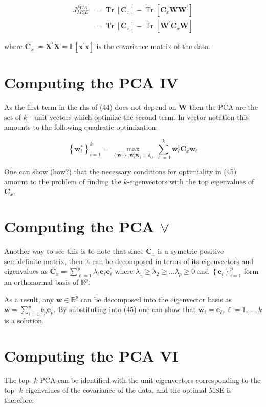 \documentclass[11pt]{article}
\theoremstyle{plain} %
\theoremstyle{remark}
\begin{document}
$$
\begin{aligned}
J_{M S E}^{P C A} & =\operatorname{Tr}\left[\mathbf{C}_{x}\right]-\operatorname{Tr}\left[\mathbf{C}_{x} \mathbf{W} \mathbf{W}^{\prime}\right] \\
& =\operatorname{Tr}\left[\mathbf{C}_{x}\right]-\operatorname{Tr}\left[\mathbf{W}^{\prime} \mathbf{C}_{x} \mathbf{W}\right]
\end{aligned}
$$

where $\mathbf{C}_{x}:=\mathbf{X}^{\prime} \mathbf{X}=\mathbb{E}\left[\mathbf{x}^{\prime} \mathbf{x}\right]$ is the covariance matrix of the data.

\section*{Computing the PCA IV}
As the first term in the rhs of (44) does not depend on $\mathbf{W}$ then the PCA are the set of $k$ - unit vectors which optimize the second term. In vector notation this amounts to the following quadratic optimization:

$$
\left\{\mathbf{w}_{i}^{*}\right\}_{i=1}^{k}=\max _{\left\{\mathbf{w}_{i}\right\}, \mathbf{w}_{i}^{\prime} \mathbf{w}_{j}=\delta_{i j}} \sum_{\ell=1}^{k} \mathbf{w}_{\ell}^{\prime} \mathbf{C}_{x} \mathbf{w}_{\ell}
$$

One can show (how?) that the necessary conditions for optimiality in (45) amount to the problem of finding the $k$-eigenvectors with the top eigenvalues of $\mathbf{C}_{x}$.

\section*{Computing the PCA $\vee$}
Another way to see this is to note that since $\mathbf{C}_{x}$ is a symetric positive semidefinite matrix, then it can be decomposed in terms of its eigenvectors and eigenvalues as $\mathbf{C}_{x}=\sum_{\ell=1}^{p} \lambda_{\ell} \mathbf{e}_{\ell} \mathbf{e}_{\ell}^{\prime}$ where $\lambda_{1} \geq \lambda_{2} \geq \ldots \lambda_{p} \geq 0$ and $\left\{\mathbf{e}_{i}\right\}_{i=1}^{p}$ form an orthonormal basis of $\mathbb{R}^{p}$.

As a result, any $\mathbf{w} \in \mathbb{R}^{p}$ can be decomposed into the eigenvector basis as $\mathbf{w}=\sum_{i=1}^{p} b_{p} \mathbf{e}_{p}$. By substituting into (45) one can show that $\mathbf{w}_{\ell}=\mathbf{e}_{\ell}, \ell=1, \ldots, k$ is a solution.

\section*{Computing the PCA VI}
The top- $k$ PCA can be identified with the unit eigenvectors corresponding to the top- $k$ eigenvalues of the covariance of the data, and the optimal MSE is therefore:
\end{document}
